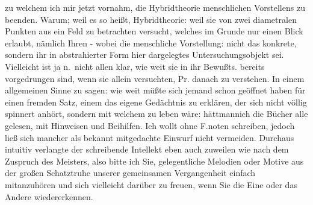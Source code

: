 \documentclass[
]{article}
\begin{document}
zu welchem ich mir jetzt vornahm, die Hybridtheorie menschlichen
Vorstellens zu beenden. Warum; weil es so heißt, Hybridtheorie: weil sie
von zwei diametralen Punkten aus ein Feld zu betrachten versucht,
welches im Grunde nur einen Blick erlaubt, nämlich Ihren - wobei die
menschliche Vorstellung: nicht das konkrete, sondern ihr in
abstrahierter Form hier dargelegtes Untersuchungsobjekt sei. Vielleicht
ist ja n.~nicht allen klar, wie weit sie in ihr Bewußts. bereits
vorgedrungen sind, wenn sie allein versuchten, Pr. danach zu verstehen.
In einem allgemeinen Sinne zu sagen: wie weit müßte sich jemand schon
geöffnet haben für einen fremden Satz, einem das eigene Gedächtnis zu
erklären, der sich nicht völlig spinnert anhört, sondern mit welchem zu
leben wäre: hättmannich die Bücher alle gelesen, mit Hinweisen und
Beihilfen. Ich wollt ohne F.noten schreiben, jedoch ließ sich mancher
als bekannt mitgedachte Einwurf nicht vermeiden. Durchaus intuitiv
verlangte der schreibende Intellekt eben auch zuweilen wie nach dem
Zuspruch des Meisters, also bitte ich Sie, gelegentliche Melodien oder
Motive aus der großen Schatztruhe unserer gemeinsamen Vergangenheit
einfach mitanzuhören und sich vielleicht darüber zu freuen, wenn Sie die
Eine oder das Andere wiedererkennen.
\end{document}
